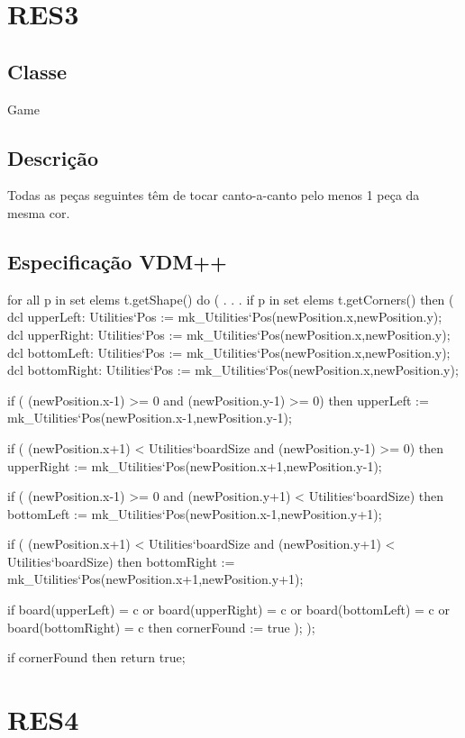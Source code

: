 \section{RES3}
\subsection{Classe}
Game
\subsection{Descrição}
Todas as peças seguintes têm de tocar canto-a-canto pelo menos 1 peça da mesma cor.
\subsection{Especificação VDM++}
\begin{vdm_al}
	for all p in set elems t.getShape() do (
	.
	.
	.
		if p in set elems t.getCorners() then (
			dcl upperLeft: Utilities`Pos := mk_Utilities`Pos(newPosition.x,newPosition.y);
			dcl upperRight: Utilities`Pos := mk_Utilities`Pos(newPosition.x,newPosition.y);	        		
			dcl bottomLeft: Utilities`Pos := mk_Utilities`Pos(newPosition.x,newPosition.y);
			dcl bottomRight: Utilities`Pos := mk_Utilities`Pos(newPosition.x,newPosition.y);
	
			if ( (newPosition.x-1) >= 0 and (newPosition.y-1) >= 0) then
				upperLeft := mk_Utilities`Pos(newPosition.x-1,newPosition.y-1);
	
			if ( (newPosition.x+1)  < Utilities`boardSize and (newPosition.y-1) >= 0) then
				upperRight := mk_Utilities`Pos(newPosition.x+1,newPosition.y-1);
		
			if ( (newPosition.x-1) >= 0 and (newPosition.y+1) < Utilities`boardSize) then	        		
				bottomLeft := mk_Utilities`Pos(newPosition.x-1,newPosition.y+1);
		
			if ( (newPosition.x+1)  < Utilities`boardSize
		and (newPosition.y+1)  < Utilities`boardSize) then
				bottomRight := mk_Utilities`Pos(newPosition.x+1,newPosition.y+1);
	
			if board(upperLeft) = c or board(upperRight) = c or board(bottomLeft) = c
		or board(bottomRight) = c then
				cornerFound := true
		);
		);

		if cornerFound then
			return true;
\end{vdm_al}

\section{RES4}
